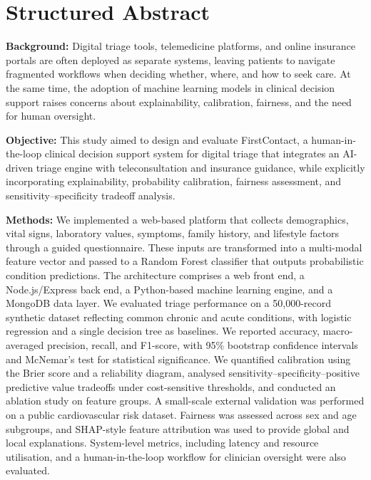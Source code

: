 \documentclass[12pt]{article}
\begin{document}
\section*{Structured Abstract}

\textbf{Background:} Digital triage tools, telemedicine platforms, and online insurance portals are often deployed as separate systems, leaving patients to navigate fragmented workflows when deciding whether, where, and how to seek care. At the same time, the adoption of machine learning models in clinical decision support raises concerns about explainability, calibration, fairness, and the need for human oversight.

\bigskip

\textbf{Objective:} This study aimed to design and evaluate FirstContact, a human-in-the-loop clinical decision support system for digital triage that integrates an AI-driven triage engine with teleconsultation and insurance guidance, while explicitly incorporating explainability, probability calibration, fairness assessment, and sensitivity--specificity tradeoff analysis.

\bigskip

\textbf{Methods:} We implemented a web-based platform that collects demographics, vital signs, laboratory values, symptoms, family history, and lifestyle factors through a guided questionnaire. These inputs are transformed into a multi-modal feature vector and passed to a Random Forest classifier that outputs probabilistic condition predictions. The architecture comprises a web front end, a Node.js/Express back end, a Python-based machine learning engine, and a MongoDB data layer. We evaluated triage performance on a 50{,}000-record synthetic dataset reflecting common chronic and acute conditions, with logistic regression and a single decision tree as baselines. We reported accuracy, macro-averaged precision, recall, and F1-score, with 95\% bootstrap confidence intervals and McNemar's test for statistical significance. We quantified calibration using the Brier score and a reliability diagram, analysed sensitivity--specificity--positive predictive value tradeoffs under cost-sensitive thresholds, and conducted an ablation study on feature groups. A small-scale external validation was performed on a public cardiovascular risk dataset. Fairness was assessed across sex and age subgroups, and SHAP-style feature attribution was used to provide global and local explanations. System-level metrics, including latency and resource utilisation, and a human-in-the-loop workflow for clinician oversight were also evaluated.
\end{document}
